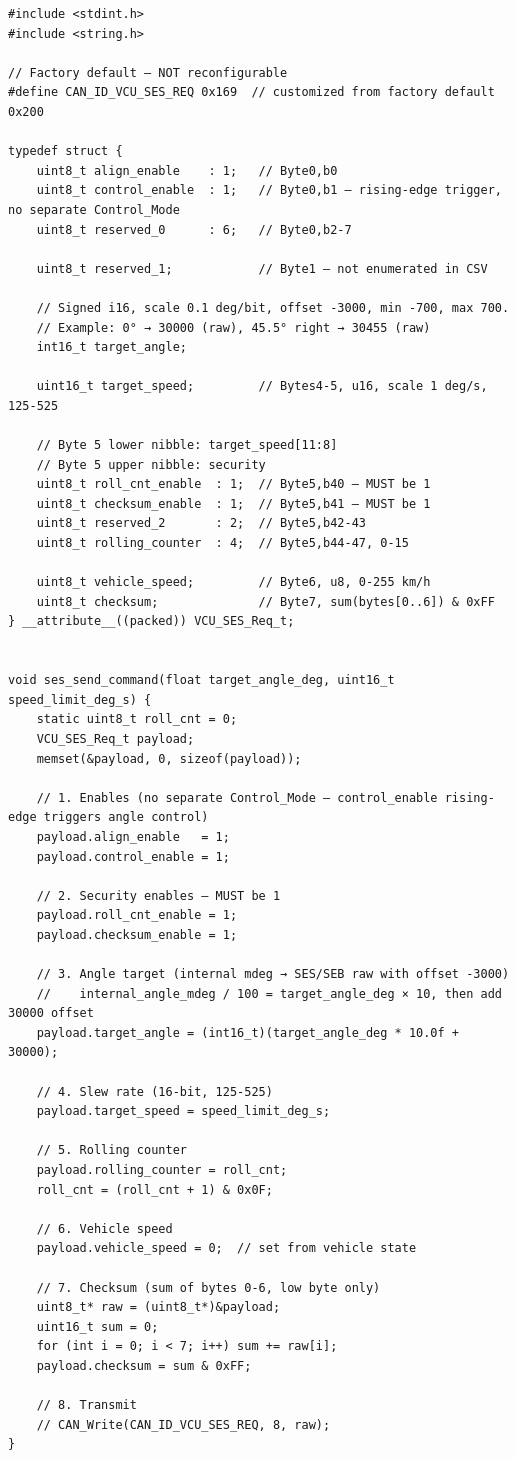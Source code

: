 \documentclass[12pt,a4paper,oneside]{report}
\begin{document}
\begin{verbatim}
#include <stdint.h>
#include <string.h>

// Factory default — NOT reconfigurable
#define CAN_ID_VCU_SES_REQ 0x169  // customized from factory default 0x200

typedef struct {
    uint8_t align_enable    : 1;   // Byte0,b0
    uint8_t control_enable  : 1;   // Byte0,b1 — rising-edge trigger, no separate Control_Mode
    uint8_t reserved_0      : 6;   // Byte0,b2-7

    uint8_t reserved_1;            // Byte1 — not enumerated in CSV

    // Signed i16, scale 0.1 deg/bit, offset -3000, min -700, max 700.
    // Example: 0° → 30000 (raw), 45.5° right → 30455 (raw)
    int16_t target_angle;

    uint16_t target_speed;         // Bytes4-5, u16, scale 1 deg/s, 125-525

    // Byte 5 lower nibble: target_speed[11:8]
    // Byte 5 upper nibble: security
    uint8_t roll_cnt_enable  : 1;  // Byte5,b40 — MUST be 1
    uint8_t checksum_enable  : 1;  // Byte5,b41 — MUST be 1
    uint8_t reserved_2       : 2;  // Byte5,b42-43
    uint8_t rolling_counter  : 4;  // Byte5,b44-47, 0-15

    uint8_t vehicle_speed;         // Byte6, u8, 0-255 km/h
    uint8_t checksum;              // Byte7, sum(bytes[0..6]) & 0xFF
} __attribute__((packed)) VCU_SES_Req_t;


void ses_send_command(float target_angle_deg, uint16_t speed_limit_deg_s) {
    static uint8_t roll_cnt = 0;
    VCU_SES_Req_t payload;
    memset(&payload, 0, sizeof(payload));

    // 1. Enables (no separate Control_Mode — control_enable rising-edge triggers angle control)
    payload.align_enable   = 1;
    payload.control_enable = 1;

    // 2. Security enables — MUST be 1
    payload.roll_cnt_enable = 1;
    payload.checksum_enable = 1;

    // 3. Angle target (internal mdeg → SES/SEB raw with offset -3000)
    //    internal_angle_mdeg / 100 = target_angle_deg × 10, then add 30000 offset
    payload.target_angle = (int16_t)(target_angle_deg * 10.0f + 30000);

    // 4. Slew rate (16-bit, 125-525)
    payload.target_speed = speed_limit_deg_s;

    // 5. Rolling counter
    payload.rolling_counter = roll_cnt;
    roll_cnt = (roll_cnt + 1) & 0x0F;

    // 6. Vehicle speed
    payload.vehicle_speed = 0;  // set from vehicle state

    // 7. Checksum (sum of bytes 0-6, low byte only)
    uint8_t* raw = (uint8_t*)&payload;
    uint16_t sum = 0;
    for (int i = 0; i < 7; i++) sum += raw[i];
    payload.checksum = sum & 0xFF;

    // 8. Transmit
    // CAN_Write(CAN_ID_VCU_SES_REQ, 8, raw);
}
\end{verbatim}
\end{document}
